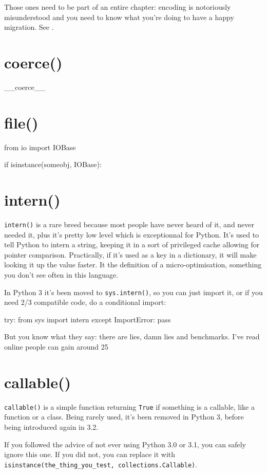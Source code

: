 Those ones need to be part of an entire chapter: encoding is notoriously misunderstood and you need to know what you're doing to have a happy migration. See .

\section{coerce()}

\_\_coerce\_\_

\section{file()}

\begin{py2}
from io import IOBase

if isinstance(someobj, IOBase):
\end{py2}

\section{intern()}

\lstinline{intern()} is a rare breed because most people have never heard of it, and never needed it, plus it's pretty low level which is exceptionnal for Python. It's used to tell Python to intern a string, keeping it in a sort of privileged cache allowing for pointer comparison. Practically, if it's used as a key in a dictionary, it will make looking it up the value faster. It the definition of a micro-optimisation, something you don't see often in this language.

In Python 3 it's been moved to \lstinline{sys.intern()}, so you can just import it, or if you need 2/3 compatible code, do a conditional import:

\begin{py2and3}
try:
    from sys import intern
except ImportError:
    pass
\end{py2and3}

But you know what they say: there are lies, damn lies and benchmarks. I've read online people can gain around 25%

\section{callable()}

\lstinline{callable()} is a simple function returning \lstinline{True} if something is a \gls{callable}, like a function or a class. Being rarely used, it's been removed in Python 3, before being introduced again in 3.2.

If you followed the advice of not ever using Python 3.0 or 3.1, you can safely ignore this one. If you did not, you can replace it with \lstinline{isinstance(the_thing_you_test, collections.Callable)}.
